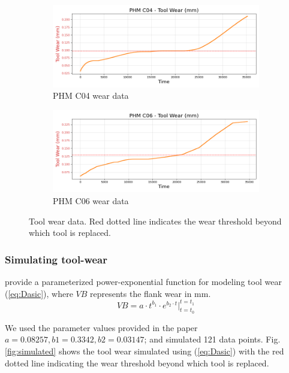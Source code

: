 \documentclass[a4paper, 12pt]{article}
\begin{document}
\begin{figure}[ht]
	\begin{subfigure}[b]{0.5\textwidth}
		\centering
		\includegraphics[width=\textwidth]{PHM_C04_wear_plot.png}  
		\caption{PHM C04 wear data}
		\label{fig:C04}
	\end{subfigure}
	\hfill
	\begin{subfigure}[b]{0.5\textwidth}
		\centering
		\includegraphics[width=\textwidth]{PHM_C06_wear_plot.png}  
		\caption{PHM C06 wear data}
		\label{fig:C06}
	\end{subfigure} 
	
	
	\caption{Tool wear data. Red dotted line indicates the wear threshold beyond which tool is replaced.}
	\label{fig:tool-wear-plots}
\end{figure}


\subsubsection*{Simulating tool-wear}
\cite{davsic2006} provide a parameterized power-exponential function for modeling tool wear (\ref{eq:Dasic}), where $VB$ represents the flank wear in mm.
\begin{equation}
	VB = a \cdot t^{b_1} \cdot e^{b_2 \cdot t} \Big|_{t=t_0}^{t=t_1}
	\label{eq:Dasic}
\end{equation}

We used the parameter values provided in the paper $a=0.08257, b1=0.3342, b2=0.03147$; and simulated 121 data points. Fig. \ref{fig:simulated} shows the tool wear simulated using (\ref{eq:Dasic}) with the red dotted line indicating the wear threshold beyond which tool is replaced.
\end{document}
